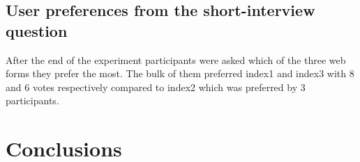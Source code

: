 \documentclass[../main/Feedback.tex]{subfiles}
\begin{document}
		\subsection{User preferences from the short-interview question}
		After the end of the experiment participants were asked which of the three web forms they prefer the most. The bulk of them preferred index1 and index3 with 8 and 6 votes respectively compared to index2 which was preferred by 3 participants. 
\section{Conclusions}
\end{document}
